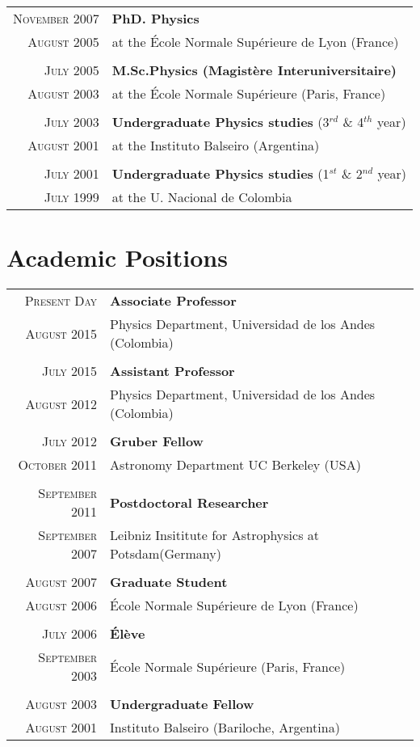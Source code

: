 \documentclass[a4paper,10pt]{article} %
\begin{document}
\begin{tabular}{rl}	
\textsc{November 2007} & {\bf PhD. Physics}\\
\textsc{August 2005}& at the \'Ecole Normale Sup\'erieure de Lyon (France) \\
&\\
\textsc{July 2005} & {\bf M.Sc.Physics (Magist\`ere Interuniversitaire)}\\  
\textsc{August 2003}& at the \'Ecole Normale Sup\'erieure (Paris, France) \\
&\\
\textsc{July 2003} & {\bf Undergraduate Physics studies} (3$^{rd}$ \& 4$^{th}$ year)\\
\textsc{August 2001} & at the Instituto Balseiro (Argentina)\\
&\\
\textsc{July 2001}  & {\bf Undergraduate Physics studies} (1$^{st}$ \& 2$^{nd}$ year)\\
\textsc{July 1999}& at the U. Nacional de Colombia\\
\end{tabular}

\color{red}
\section{Academic Positions}
\color{black}

\begin{tabular}{rl}	
 \textsc{Present Day} &  {\bf Associate Professor}\\
 \textsc{August 2015} & Physics Department, Universidad de los Andes (Colombia) \\
& \\
 \textsc{July 2015} &  {\bf Assistant Professor}\\
 \textsc{August 2012} & Physics Department, Universidad de los Andes (Colombia) \\
&\\
 \textsc{July 2012} &  {\bf Gruber Fellow}\\
 \textsc{October 2011} & Astronomy Department UC Berkeley (USA) \\
&\\
 \textsc{September 2011} &  {\bf Postdoctoral Researcher}\\
 \textsc{September 2007} & Leibniz Insititute for Astrophysics at Potsdam(Germany) \\ 
&\\
 \textsc{August 2007} &  {\bf Graduate Student}\\
 \textsc{August 2006} & \'Ecole Normale Sup\'erieure de Lyon (France)\\
&\\
 \textsc{July 2006} &  {\bf \'El\`eve}\\
 \textsc{September 2003} & \'Ecole Normale Sup\'erieure (Paris, France)\\
&\\
 \textsc{August 2003} &  {\bf Undergraduate Fellow}\\
 \textsc{August 2001} & Instituto Balseiro (Bariloche, Argentina)\\
\end{tabular}
\end{document}
